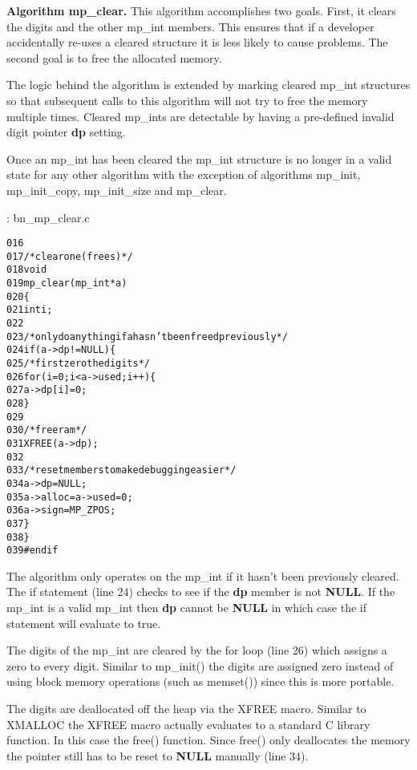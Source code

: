 \documentclass[b5paper]{book}
\begin{document}
\textbf{Algorithm mp\_clear.}
This algorithm accomplishes two goals.  First, it clears the digits and the other mp\_int members.  This ensures that 
if a developer accidentally re-uses a cleared structure it is less likely to cause problems.  The second goal
is to free the allocated memory.

The logic behind the algorithm is extended by marking cleared mp\_int structures so that subsequent calls to this
algorithm will not try to free the memory multiple times.  Cleared mp\_ints are detectable by having a pre-defined invalid 
digit pointer \textbf{dp} setting.

Once an mp\_int has been cleared the mp\_int structure is no longer in a valid state for any other algorithm
with the exception of algorithms mp\_init, mp\_init\_copy, mp\_init\_size and mp\_clear.

\vspace{+3mm}\begin{small}
\hspace{-5.1mm}{\bf File}: bn\_mp\_clear.c
\vspace{-3mm}
\begin{alltt}
016   
017   /* clear one (frees)  */
018   void
019   mp_clear (mp_int * a)
020   \{
021     int i;
022   
023     /* only do anything if a hasn't been freed previously */
024     if (a->dp != NULL) \{
025       /* first zero the digits */
026       for (i = 0; i < a->used; i++) \{
027           a->dp[i] = 0;
028       \}
029   
030       /* free ram */
031       XFREE(a->dp);
032   
033       /* reset members to make debugging easier */
034       a->dp    = NULL;
035       a->alloc = a->used = 0;
036       a->sign  = MP_ZPOS;
037     \}
038   \}
039   #endif
\end{alltt}
\end{small}

The algorithm only operates on the mp\_int if it hasn't been previously cleared.  The if statement (line 24)
checks to see if the \textbf{dp} member is not \textbf{NULL}.  If the mp\_int is a valid mp\_int then \textbf{dp} cannot be
\textbf{NULL} in which case the if statement will evaluate to true.

The digits of the mp\_int are cleared by the for loop (line 26) which assigns a zero to every digit.  Similar to mp\_init()
the digits are assigned zero instead of using block memory operations (such as memset()) since this is more portable.  

The digits are deallocated off the heap via the XFREE macro.  Similar to XMALLOC the XFREE macro actually evaluates to
a standard C library function.  In this case the free() function.  Since free() only deallocates the memory the pointer
still has to be reset to \textbf{NULL} manually (line 34).  
\end{document}
